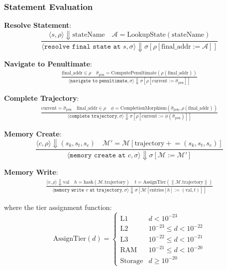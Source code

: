 \documentclass[twocolumn,10pt]{article}
\newcommand{\cataddr}{\mathcal{A}}
\newcommand{\pentstate}{\hat{\sigma}_{\mathrm{pen}}}
\theoremstyle{definition}
\theoremstyle{remark}
\begin{document}
\subsubsection{Statement Evaluation}

\textbf{Resolve Statement}:
\begin{equation}
    \frac{\langle s, \rho\rangle \Downarrow \text{stateName} \quad \cataddr = \text{LookupState}(\text{stateName})}{\langle\texttt{resolve final state at } s, \sigma\rangle \Downarrow \sigma[\rho[\text{final\_addr} := \cataddr]]}
\end{equation}

\textbf{Navigate to Penultimate}:
\begin{multline}
    \frac{\text{final\_addr} \in \rho \quad \pentstate = \text{ComputePenultimate}(\rho(\text{final\_addr}))}{\langle\texttt{navigate to penultimate}, \sigma\rangle \Downarrow \sigma[\rho[\text{current} := \pentstate]]}
\end{multline}

\textbf{Complete Trajectory}:
\begin{multline}
    \frac{\text{current} = \pentstate \quad \text{final\_addr} \in \rho \quad \phi = \text{CompletionMorphism}(\pentstate, \rho(\text{final\_addr}))}{\langle\texttt{complete trajectory}, \sigma\rangle \Downarrow \sigma[\rho[\text{current} := \phi(\pentstate)]]}
\end{multline}

\textbf{Memory Create}:
\begin{equation}
    \frac{\langle c, \rho\rangle \Downarrow (s_k, s_t, s_e) \quad \mathcal{M}' = \mathcal{M}[\text{trajectory} \mathrel{+}= (s_k, s_t, s_e)]}{\langle\texttt{memory create at } c, \sigma\rangle \Downarrow \sigma[\mathcal{M} := \mathcal{M}']}
\end{equation}

\textbf{Memory Write}:
\begin{multline}
    \frac{\langle v, \rho\rangle \Downarrow \text{val} \quad h = \text{hash}(\mathcal{M}.\text{trajectory}) \quad t = \text{AssignTier}(\|\mathcal{M}.\text{trajectory}\|)}{\langle\texttt{memory write } v \texttt{ at trajectory}, \sigma\rangle \Downarrow \sigma[\mathcal{M}[\text{entries}[h] := (\text{val}, t)]]}
\end{multline}

where the tier assignment function:
\begin{equation}
    \text{AssignTier}(d) = \begin{cases}
        \text{L1} & d < 10^{-23} \\
        \text{L2} & 10^{-23} \leq d < 10^{-22} \\
        \text{L3} & 10^{-22} \leq d < 10^{-21} \\
        \text{RAM} & 10^{-21} \leq d < 10^{-20} \\
        \text{Storage} & d \geq 10^{-20}
    \end{cases}
\end{equation}
\end{document}
